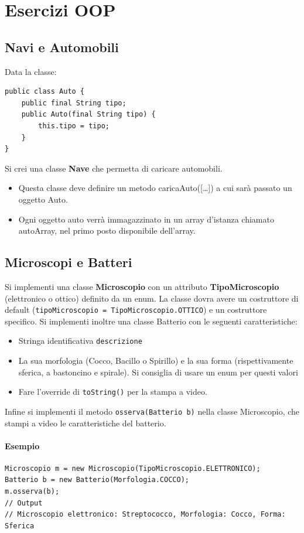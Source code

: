 \documentclass{article}
\begin{document}
\section{Esercizi OOP}
\subsection{Navi e Automobili}
Data la classe:
\begin{verbatim}
public class Auto {
    public final String tipo;
    public Auto(final String tipo) {
        this.tipo = tipo;
    }
}
\end{verbatim}
Si crei una classe \textbf{Nave} che permetta di caricare automobili.
\begin{itemize}
    \item Questa classe deve deﬁnire un metodo caricaAuto([…]) a cui sarà passato un oggetto Auto.
    \item Ogni
oggetto auto verrà immagazzinato in un array d’istanza chiamato autoArray, nel primo posto
disponibile dell’array.
\end{itemize}

\subsection{Microscopi e Batteri}
Si implementi una classe \textbf{Microscopio} con un attributo \textbf{TipoMicroscopio} (elettronico o ottico) definito da un enum.
La classe dovra avere un costruttore di default (\texttt{tipoMicroscopio = TipoMicroscopio.OTTICO}) e un costruttore specifico.
Si implementi inoltre una classe Batterio con le seguenti caratteristiche:
\begin{itemize}
    \item Stringa identificativa \texttt{descrizione}
    \item La sua morfologia (Cocco, Bacillo o Spirillo) e la sua forma (rispettivamente sferica, a bastoncino e spirale). Si consiglia di usare un enum per questi valori
    \item Fare l'override di \texttt{toString()} per la stampa a video.
\end{itemize}
Infine si implementi il metodo \texttt{osserva(Batterio b)} nella classe Microscopio, che stampi a video le caratteristiche del batterio. 
\paragraph{Esempio}
\begin{verbatim}
Microscopio m = new Microscopio(TipoMicroscopio.ELETTRONICO);
Batterio b = new Batterio(Morfologia.COCCO);
m.osserva(b);
// Output
// Microscopio elettronico: Streptococco, Morfologia: Cocco, Forma: Sferica
\end{verbatim}
\end{document}
